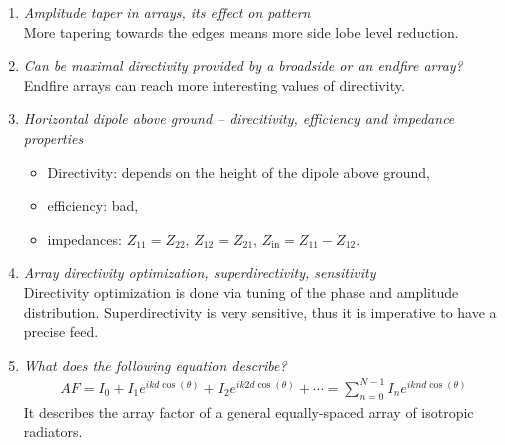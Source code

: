 \documentclass[11pt,a4paper]{article}
\begin{document}
\begin{enumerate}
    \item \emph{Amplitude taper in arrays, its effect on pattern}\\
    More tapering towards the edges means more side lobe level reduction.
    
    \item \emph{Can be maximal directivity provided by a broadside or an endfire array?}\\
    Endfire arrays can reach more interesting values of directivity.
    
    \item \emph{Horizontal dipole above ground -- direcitivity, efficiency and impedance properties}
    \begin{itemize}
        \item Directivity: depends on the height of the dipole above ground,
        \item efficiency: bad,
        \item impedances: $Z_{11} = Z_{22}$, $Z_{12} = Z_{21}$, $Z_{\mathrm{in}} = Z_{11} - Z_{12}$.
    \end{itemize}
    
    \item \emph{Array directivity optimization, superdirectivity, sensitivity}\\
    Directivity optimization is done via tuning of the phase and amplitude distribution. Superdirectivity is very sensitive, thus it is imperative to have a precise feed.
    
    \item \emph{What does the following equation describe?}
    \begin{align*}
        AF = I_0 + I_1e^{ikd\cos(\theta)} + I_2e^{ik2d\cos(\theta)} + \cdots = \sum_{n=0}^{N-1} I_ne^{iknd\cos(\theta)}
    \end{align*}
    It describes the array factor of a general equally-spaced array of isotropic radiators.


\end{enumerate}
\end{document}
